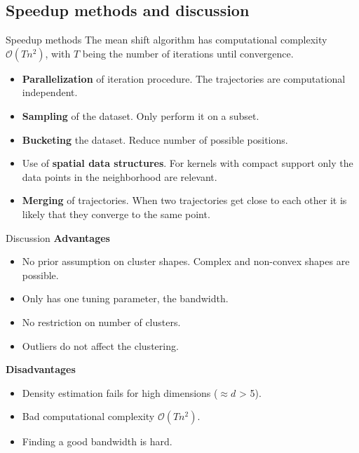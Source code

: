 \documentclass[18pt]{beamer}
\begin{document}
\subsection{Speedup methods and discussion}

\begin{frame}{Speedup methods}
	The mean shift algorithm has computational complexity $\mathcal{O}(Tn^2)$, with $T$ being the number of iterations until convergence.
	
	\begin{itemize}
		\item \textbf{Parallelization} of iteration procedure. The trajectories are computational independent.
		
		\item \textbf{Sampling} of the dataset. Only perform it on a subset.
		
		\item \textbf{Bucketing} the dataset. Reduce number of possible positions.
		
		\item Use of \textbf{spatial data structures}. For kernels with compact support only the data points in the neighborhood are relevant.
		
		\item \textbf{Merging} of trajectories. When two trajectories get close to each other it is likely that they converge to the same point.
	\end{itemize}
\end{frame}


\begin{frame}{Discussion}
\textbf{Advantages}
\begin{itemize}
	\item No prior assumption on cluster shapes. Complex and non-convex shapes are possible.
	\item Only has one tuning parameter, the bandwidth.
	\item No restriction on number of clusters.
	\item Outliers do not affect the clustering.
\end{itemize}
\textbf{Disadvantages}
\begin{itemize}
	\item Density estimation fails for high dimensions ($\approx d$ > 5).
	\item Bad computational complexity $\mathcal{O}(Tn^2)$.
	\item Finding a good bandwidth is hard.
\end{itemize}
\end{frame}
\end{document}
